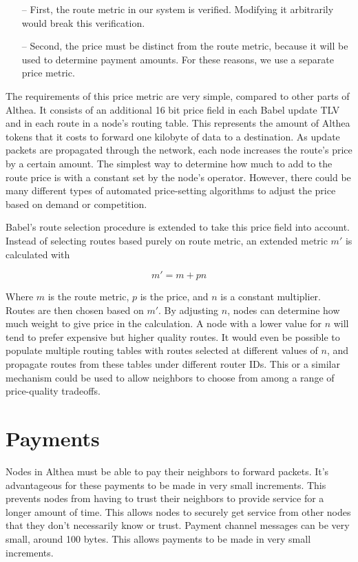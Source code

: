\documentclass[11pt]{article}
\begin{document}
\begin{itemize}
\item[--] First, the route metric in our system is verified. Modifying it arbitrarily would break this verification.
\item[--] Second, the price must be distinct from the route metric, because it will be used to determine payment amounts. For these reasons, we use a separate price metric.
\end{itemize}

The requirements of this price metric are very simple, compared to other parts of Althea. It consists of an additional 16 bit price field in each Babel update TLV and in each route in a node’s routing table. This represents the amount of Althea tokens that it costs to forward one kilobyte of data to a destination. As update packets are propagated through the network, each node increases the route’s price by a certain amount. The simplest way to determine how much to add to the route price is with a constant set by the node’s operator. However, there could be many different types of automated price-setting algorithms to adjust the price based on demand or competition.

\pagebreak[3]

Babel’s route selection procedure is extended to take this price field into account. Instead of selecting routes based purely on route metric, an extended metric $m'$ is calculated with

\[
m'= m+pn
\]

Where $m$ is the route metric, $p$ is the price, and $n$ is a constant multiplier. Routes are then chosen based on $m'$. By adjusting $n$, nodes can determine how much weight to give price in the calculation. A node with a lower value for $n$ will tend to prefer expensive but higher quality routes. It would even be possible to populate multiple routing tables with routes selected at different values of $n$, and propagate routes from these tables under different router IDs. This or a similar mechanism could be used to allow neighbors to choose from among a range of price-quality tradeoffs.

\section{Payments}
\label{sec:payments}
Nodes in Althea must be able to pay their neighbors to forward packets. It’s advantageous for these payments to be made in very small increments. This prevents nodes from having to trust their neighbors to provide service for a longer amount of time. This allows nodes to securely get service from other nodes that they don’t necessarily know or trust. Payment channel messages can be very small, around 100 bytes. This allows payments to be made in very small increments.
\end{document}
